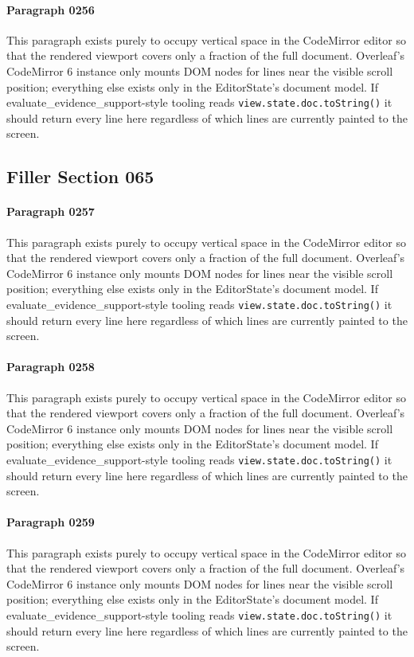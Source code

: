 \documentclass{article}
\begin{document}
\paragraph{Paragraph 0256}
This paragraph exists purely to occupy vertical space in the CodeMirror editor so that the rendered viewport covers only a fraction of the full document. Overleaf's CodeMirror 6 instance only mounts DOM nodes for lines near the visible scroll position; everything else exists only in the EditorState's document model. If evaluate\_evidence\_support-style tooling reads \texttt{view.state.doc.toString()} it should return every line here regardless of which lines are currently painted to the screen.

\subsection{Filler Section 065}
\paragraph{Paragraph 0257}
This paragraph exists purely to occupy vertical space in the CodeMirror editor so that the rendered viewport covers only a fraction of the full document. Overleaf's CodeMirror 6 instance only mounts DOM nodes for lines near the visible scroll position; everything else exists only in the EditorState's document model. If evaluate\_evidence\_support-style tooling reads \texttt{view.state.doc.toString()} it should return every line here regardless of which lines are currently painted to the screen.

\paragraph{Paragraph 0258}
This paragraph exists purely to occupy vertical space in the CodeMirror editor so that the rendered viewport covers only a fraction of the full document. Overleaf's CodeMirror 6 instance only mounts DOM nodes for lines near the visible scroll position; everything else exists only in the EditorState's document model. If evaluate\_evidence\_support-style tooling reads \texttt{view.state.doc.toString()} it should return every line here regardless of which lines are currently painted to the screen.

\paragraph{Paragraph 0259}
This paragraph exists purely to occupy vertical space in the CodeMirror editor so that the rendered viewport covers only a fraction of the full document. Overleaf's CodeMirror 6 instance only mounts DOM nodes for lines near the visible scroll position; everything else exists only in the EditorState's document model. If evaluate\_evidence\_support-style tooling reads \texttt{view.state.doc.toString()} it should return every line here regardless of which lines are currently painted to the screen.
\end{document}
